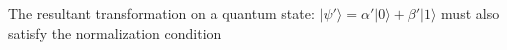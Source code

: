 \documentclass[preview]{standalone}
\begin{document}
\begin{center}
The resultant transformation on a quantum state: $|\psi'\rangle = \alpha'|0\rangle + \beta'|1\rangle$ must also satisfy the normalization condition
\end{center}
\end{document}
